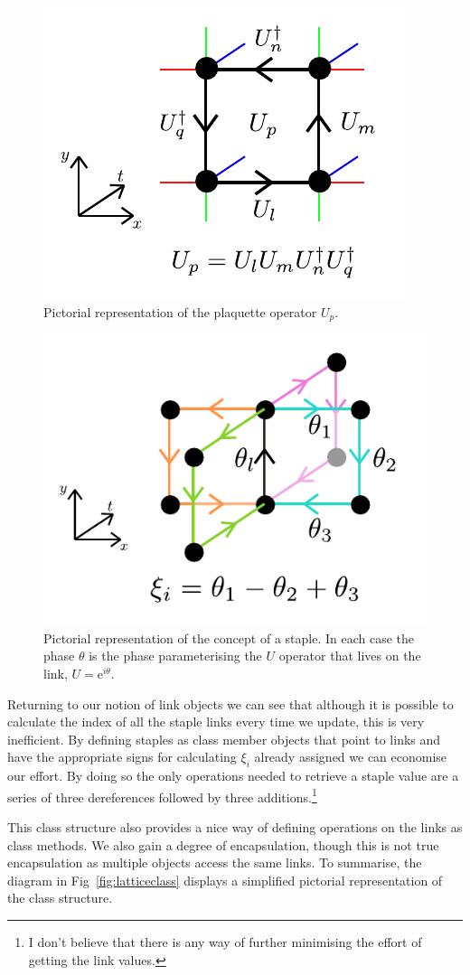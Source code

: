 \documentclass[12pt]{article}
\begin{document}
\begin{figure}
\centering
\hspace*{-1cm}\includegraphics[width=0.5\linewidth]{plaq.pdf}
\caption{\label{fig:plaq} Pictorial representation of the plaquette operator $U_p$.}
\end{figure}

\begin{figure}
\centering
\hspace*{-1cm}\includegraphics[width=0.5\linewidth]{staples.pdf}
\caption{\label{fig:staples} Pictorial representation of the concept of a staple. In each case the phase $\theta$ is the phase parameterising the $U$ operator that lives on the link, $U = \mathrm{e}^{i\theta}$.}
\end{figure}

\par Returning to our notion of link objects we can see that although it is possible to calculate the index of all the staple links every time we update, this is very inefficient. By defining staples as class member objects that point to links and have the appropriate signs for calculating $\xi_i$ already assigned we can economise our effort. By doing so the only operations needed to retrieve a staple value are a series of three dereferences followed by three additions.\footnote{I don't believe that there is any way of further minimising the effort of getting the link values.}

\par This class structure also provides a nice way of defining operations on the links as class methods. We also gain a degree of encapsulation, though this is not true encapsulation as multiple objects access the same links. To summarise, the diagram in Fig~\ref{fig:latticeclass} displays a simplified pictorial representation of the class structure.
\end{document}
